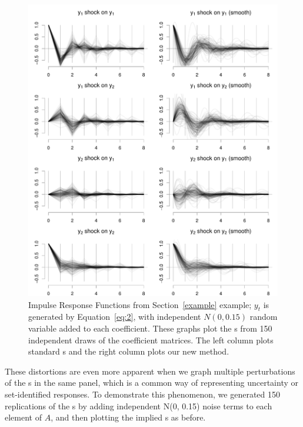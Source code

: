 \documentclass[12pt,fleqn]{article}
\begin{document}
\begin{figure}[t]
  \centering
  \includegraphics{graphs/numeric2.pdf}
  \caption{Impulse Response Functions from Section~\ref{example}
    example; $y_t$ is generated by Equation~\eqref{eq:2}, with
    independent $N(0,0.15)$ random variable added to each
    coefficient. These graphs plot the \IRF s from 150 independent
    draws of the coefficient matrices. The left column plots standard
    \IRF s and the right column plots our new method.}
  \label{f2}
\end{figure}

These distortions are even more apparent when we graph multiple
perturbations of the \IRF s in the same panel, which is a common way
of representing uncertainty or set-identified responses. To
demonstrate this phenomenon, we generated 150 replications of the \IRF
s by adding independent N(0, 0.15) noise terms to each element of $A$,
and then plotting the implied \IRF s as before.
\end{document}
